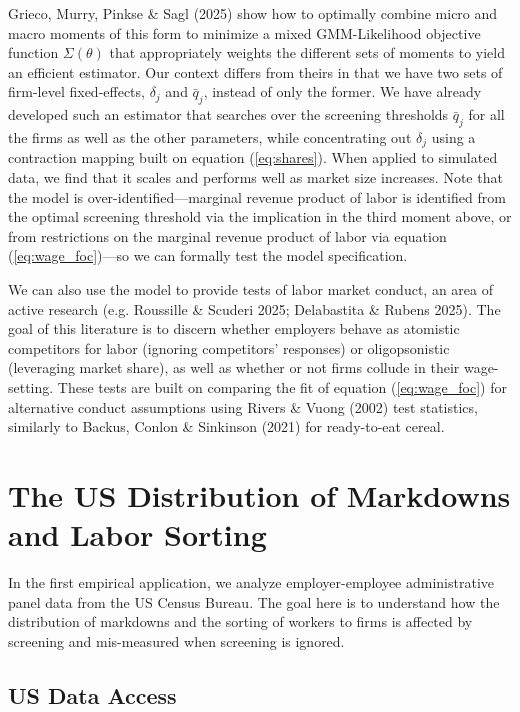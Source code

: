 \documentclass[11pt]{article}
\begin{document}
Grieco, Murry, Pinkse \& Sagl (2025) show how to optimally combine micro and macro moments of this form to minimize a mixed GMM-Likelihood objective function $\Sigma(\theta)$ that appropriately weights the different sets of moments to yield an efficient estimator. Our context differs from theirs in that we have two sets of firm-level fixed-effects, $\delta_j$ and $\bar q_j$, instead of only the former. We have already developed such an estimator that searches over the screening thresholds $\bar q_j$ for all the firms as well as the other parameters, while concentrating out $\delta_j$ using a contraction mapping built on equation (\ref{eq:shares}). When applied to simulated data, we find that it scales and performs well as market size increases. Note that the model is over-identified---marginal revenue product of labor is identified from the optimal screening threshold via the implication in the third moment above, or from restrictions on the marginal revenue product of labor via equation (\ref{eq:wage_foc})---so we can formally test the model specification.

We can also use the model to provide tests of labor market conduct, an area of active research (e.g. Roussille \& Scuderi 2025; Delabastita \& Rubens 2025). The goal of this literature is to discern whether employers behave as atomistic competitors for labor (ignoring competitors' responses) or oligopsonistic (leveraging market share), as well as whether or not firms collude in their wage-setting. These tests are built on comparing the fit of equation (\ref{eq:wage_foc}) for alternative conduct assumptions using Rivers \& Vuong (2002) test statistics, similarly to Backus, Conlon \& Sinkinson (2021) for ready-to-eat cereal.

\section{The US Distribution of Markdowns and Labor Sorting}

In the first empirical application, we analyze employer-employee administrative panel data from the US Census Bureau. The goal here is to understand how the distribution of markdowns and the sorting of workers to firms is affected by screening and mis-measured when screening is ignored. 


\subsection{US Data Access}
\end{document}
